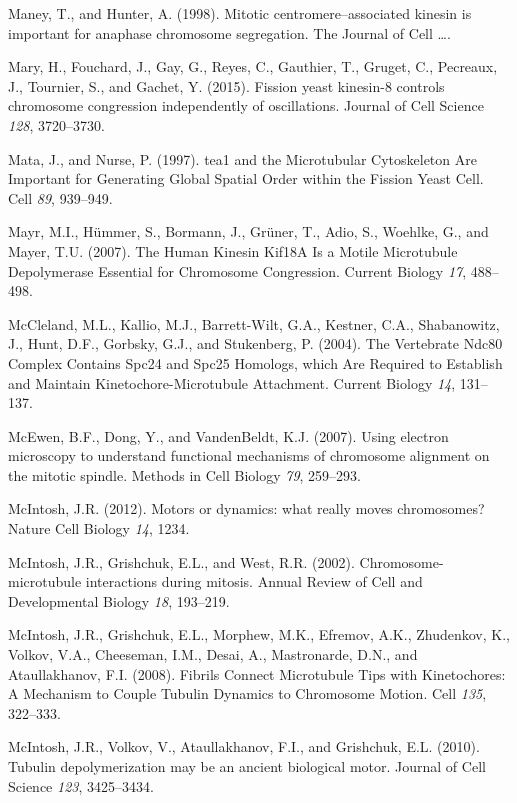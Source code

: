 \documentclass[12pt,a4paper,twoside,openright]{book}
\begin{document}
\hypertarget{ref-Maney1998}{}
Maney, T., and Hunter, A. (1998). Mitotic centromere--associated kinesin
is important for anaphase chromosome segregation. The Journal of Cell
\ldots{}.

\hypertarget{ref-Mary2015}{}
Mary, H., Fouchard, J., Gay, G., Reyes, C., Gauthier, T., Gruget, C.,
Pecreaux, J., Tournier, S., and Gachet, Y. (2015). Fission yeast
kinesin-8 controls chromosome congression independently of oscillations.
Journal of Cell Science \emph{128}, 3720--3730.

\hypertarget{ref-Mata1997}{}
Mata, J., and Nurse, P. (1997). tea1 and the Microtubular Cytoskeleton
Are Important for Generating Global Spatial Order within the Fission
Yeast Cell. Cell \emph{89}, 939--949.

\hypertarget{ref-Mayr2007}{}
Mayr, M.I., Hümmer, S., Bormann, J., Grüner, T., Adio, S., Woehlke, G.,
and Mayer, T.U. (2007). The Human Kinesin Kif18A Is a Motile Microtubule
Depolymerase Essential for Chromosome Congression. Current Biology
\emph{17}, 488--498.

\hypertarget{ref-McCleland2004}{}
McCleland, M.L., Kallio, M.J., Barrett-Wilt, G.A., Kestner, C.A.,
Shabanowitz, J., Hunt, D.F., Gorbsky, G.J., and Stukenberg, P. (2004).
The Vertebrate Ndc80 Complex Contains Spc24 and Spc25 Homologs, which
Are Required to Establish and Maintain Kinetochore-Microtubule
Attachment. Current Biology \emph{14}, 131--137.

\hypertarget{ref-McEwen2007}{}
McEwen, B.F., Dong, Y., and VandenBeldt, K.J. (2007). Using electron
microscopy to understand functional mechanisms of chromosome alignment
on the mitotic spindle. Methods in Cell Biology \emph{79}, 259--293.

\hypertarget{ref-McIntosh2012}{}
McIntosh, J.R. (2012). Motors or dynamics: what really moves
chromosomes? Nature Cell Biology \emph{14}, 1234.

\hypertarget{ref-McIntosh2002b}{}
McIntosh, J.R., Grishchuk, E.L., and West, R.R. (2002).
Chromosome-microtubule interactions during mitosis. Annual Review of
Cell and Developmental Biology \emph{18}, 193--219.

\hypertarget{ref-McIntosh2008}{}
McIntosh, J.R., Grishchuk, E.L., Morphew, M.K., Efremov, A.K.,
Zhudenkov, K., Volkov, V.A., Cheeseman, I.M., Desai, A., Mastronarde,
D.N., and Ataullakhanov, F.I. (2008). Fibrils Connect Microtubule Tips
with Kinetochores: A Mechanism to Couple Tubulin Dynamics to Chromosome
Motion. Cell \emph{135}, 322--333.

\hypertarget{ref-McIntosh2010}{}
McIntosh, J.R., Volkov, V., Ataullakhanov, F.I., and Grishchuk, E.L.
(2010). Tubulin depolymerization may be an ancient biological motor.
Journal of Cell Science \emph{123}, 3425--3434.
\end{document}
